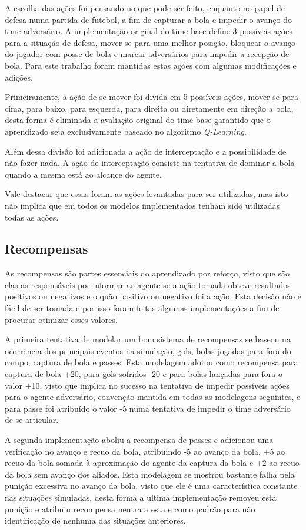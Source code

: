 A escolha das ações foi pensando no que pode ser feito, enquanto no papel de
defesa numa partida de futebol, a fim de capturar a bola e impedir o avanço do
time adversário. A implementação original do time base define 3 possíveis ações
para a situação de defesa, mover-se para uma melhor posição, bloquear o avanço
do jogador com posse de bola e marcar adversários para impedir a recepção de
bola. Para este trabalho foram mantidas estas ações com algumas modificações e
adições.

Primeiramente, a ação de se mover foi divida em 5 possíveis ações, mover-se para
cima, para baixo, para esquerda, para direita ou diretamente em direção a bola, desta forma é eliminada a
avaliação original do time base garantido que o aprendizado seja exclusivamente
baseado no algoritmo \textit{Q-Learning}.

Além dessa divisão foi adicionada a ação de interceptação e a possibilidade de
não fazer nada. A ação de interceptação consiste na tentativa de dominar a bola
quando a mesma está ao alcance do agente.

Vale destacar que essas foram as ações levantadas para ser utilizadas, mas isto
não implica que em todos os modelos implementados tenham sido utilizadas todas
as ações.

\subsection{Recompensas}\label{rewards}

As recompensas são partes essenciais do aprendizado por reforço, visto que são
elas as responsáveis por informar ao agente se a ação tomada obteve resultados
positivos ou negativos e o quão positivo ou negativo foi a ação. Esta decisão
não é fácil de ser tomada e por isso foram feitas algumas implementações a fim
de procurar otimizar esses valores.

A primeira tentativa de modelar um bom sistema de recompensas se baseou na
ocorrência dos principais eventos na simulação, gols, bolas jogadas para fora do
campo, captura de bola e passes. Esta modelagem adotou como recompensa para
captura de bola +20, para gols sofridos -20 e para bolas lançadas para fora o
valor +10, visto que implica no sucesso na tentativa de impedir possíveis ações para o
agente adversário, convenção mantida em todas as
modelagens seguintes, e para passe foi atribuído o valor -5 numa tentativa de
impedir o time adversário de se articular.

A segunda implementação aboliu a recompensa de passes e adicionou uma
verificação no avanço e recuo da bola, atribuindo -5 ao avanço da bola, +5 ao
recuo da bola somada à aproximação do agente da captura da bola e +2 ao recuo da
bola sem avanço dos aliados. Esta modelagem se mostrou bastante falha pela
punição excessiva no avanço da bola, visto que ele é uma
característica constante nas situações simuladas, desta forma a última
implementação removeu esta punição e atribuiu recompensa neutra a esta e como
padrão para não identificação de nenhuma das situações anteriores.

